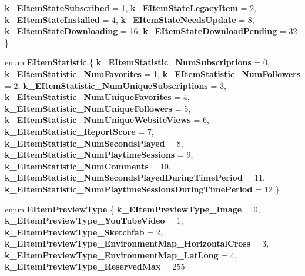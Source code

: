 \begin{DoxyCompactItemize}
{\bfseries k\+\_\+\+E\+Item\+State\+Subscribed} = 1, 
{\bfseries k\+\_\+\+E\+Item\+State\+Legacy\+Item} = 2, 
{\bfseries k\+\_\+\+E\+Item\+State\+Installed} = 4, 
\newline
{\bfseries k\+\_\+\+E\+Item\+State\+Needs\+Update} = 8, 
{\bfseries k\+\_\+\+E\+Item\+State\+Downloading} = 16, 
{\bfseries k\+\_\+\+E\+Item\+State\+Download\+Pending} = 32
 \}
\item 
\mbox{\label{namespace_valve_1_1_steamworks_a8adc0e7157fd68a4d1e1c4d89aeb1b02}} 
enum {\bfseries E\+Item\+Statistic} \{ \newline
{\bfseries k\+\_\+\+E\+Item\+Statistic\+\_\+\+Num\+Subscriptions} = 0, 
{\bfseries k\+\_\+\+E\+Item\+Statistic\+\_\+\+Num\+Favorites} = 1, 
{\bfseries k\+\_\+\+E\+Item\+Statistic\+\_\+\+Num\+Followers} = 2, 
{\bfseries k\+\_\+\+E\+Item\+Statistic\+\_\+\+Num\+Unique\+Subscriptions} = 3, 
\newline
{\bfseries k\+\_\+\+E\+Item\+Statistic\+\_\+\+Num\+Unique\+Favorites} = 4, 
{\bfseries k\+\_\+\+E\+Item\+Statistic\+\_\+\+Num\+Unique\+Followers} = 5, 
{\bfseries k\+\_\+\+E\+Item\+Statistic\+\_\+\+Num\+Unique\+Website\+Views} = 6, 
{\bfseries k\+\_\+\+E\+Item\+Statistic\+\_\+\+Report\+Score} = 7, 
\newline
{\bfseries k\+\_\+\+E\+Item\+Statistic\+\_\+\+Num\+Seconds\+Played} = 8, 
{\bfseries k\+\_\+\+E\+Item\+Statistic\+\_\+\+Num\+Playtime\+Sessions} = 9, 
{\bfseries k\+\_\+\+E\+Item\+Statistic\+\_\+\+Num\+Comments} = 10, 
{\bfseries k\+\_\+\+E\+Item\+Statistic\+\_\+\+Num\+Seconds\+Played\+During\+Time\+Period} = 11, 
\newline
{\bfseries k\+\_\+\+E\+Item\+Statistic\+\_\+\+Num\+Playtime\+Sessions\+During\+Time\+Period} = 12
 \}
\item 
\mbox{\label{namespace_valve_1_1_steamworks_af47608dfe6d1f0f4bccae7a51f1fdbff}} 
enum {\bfseries E\+Item\+Preview\+Type} \{ \newline
{\bfseries k\+\_\+\+E\+Item\+Preview\+Type\+\_\+\+Image} = 0, 
{\bfseries k\+\_\+\+E\+Item\+Preview\+Type\+\_\+\+You\+Tube\+Video} = 1, 
{\bfseries k\+\_\+\+E\+Item\+Preview\+Type\+\_\+\+Sketchfab} = 2, 
{\bfseries k\+\_\+\+E\+Item\+Preview\+Type\+\_\+\+Environment\+Map\+\_\+\+Horizontal\+Cross} = 3, 
\newline
{\bfseries k\+\_\+\+E\+Item\+Preview\+Type\+\_\+\+Environment\+Map\+\_\+\+Lat\+Long} = 4, 
{\bfseries k\+\_\+\+E\+Item\+Preview\+Type\+\_\+\+Reserved\+Max} = 255

\end{DoxyCompactItemize}
